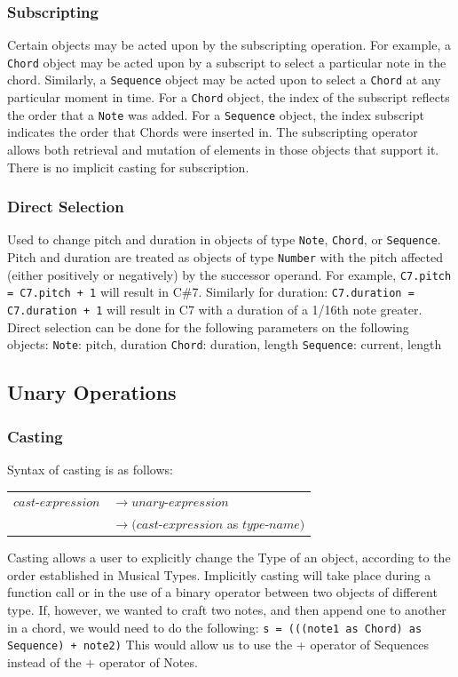 \documentclass[12pt,A4]{book}
\begin{document}
\subsubsection{Subscripting}
Certain objects may be acted upon by the subscripting operation. For example, a \verb|Chord| object may be acted upon by a subscript to select a particular note in the chord. Similarly, a \verb|Sequence| object may be acted upon to select a \verb|Chord| at any particular moment in time. For a \verb|Chord| object, the index of the subscript reflects the order that a \verb|Note| was added. For a \verb|Sequence| object, the index subscript indicates the order that Chords were inserted in.
The subscripting operator allows both retrieval and mutation of elements in those objects that support it. There is no implicit casting for subscription.

\subsubsection{Direct Selection}
Used to change pitch and duration in objects of type \verb|Note|, \verb|Chord|, or \verb|Sequence|. Pitch and duration are treated as objects of type  \verb|Number| with the pitch affected (either positively or negatively) by the successor operand. For example, \verb|C7.pitch = C7.pitch + 1| will result in C\#7.
Similarly for duration: \verb|C7.duration = C7.duration + 1| will result in C7 with a duration of a 1/16th note greater.
Direct selection can be done for the following parameters on the following objects:
\verb|Note|: pitch, duration
\verb|Chord|: duration, length
\verb|Sequence|: current, length

\subsection{Unary Operations}
\subsubsection{Casting}
Syntax of casting is as follows:

\begin{tabular}{l l}
$cast\mbox{-}expression$  & $\rightarrow unary\mbox{-}expression$ \\
& $\rightarrow (cast\mbox{-}expression$ as $type\mbox{-}name)$ 
\end{tabular}

Casting allows a user to explicitly change the Type of an object, according to the order established in Musical Types. Implicitly casting will take place during a function call or in the use of a binary operator between two objects of different type. If, however, we wanted to craft two notes, and then append one to another in a chord, we would need to do the following:
\verb|s = (((note1 as Chord) as Sequence) + note2)|
This would allow us to use the + operator of Sequences instead of the + operator of Notes.
\end{document}
